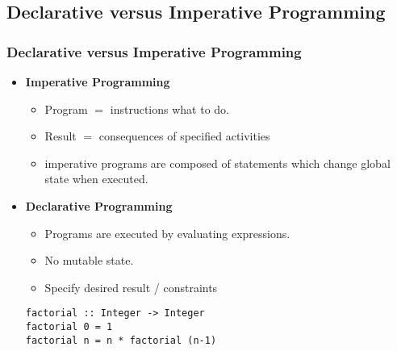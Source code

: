 \subsection{Declarative versus Imperative Programming}

\begin{frame}[fragile]
  \frametitle{Declarative versus Imperative Programming}
  \begin{itemize}
    \item {\bf Imperative Programming}
	  \begin{itemize}
	    \item Program $=$ instructions what to do.
	    \item Result $=$ consequences of specified activities
	    \item imperative programs are composed of statements which change global state when executed. 
	  \end{itemize}
    \item {\bf Declarative Programming}
	  \begin{itemize}
	    \item Programs are executed by evaluating expressions.
	    \item No mutable state. 
	    \item Specify desired result / constraints
	  \end{itemize}
\begin{lstlisting}
factorial :: Integer -> Integer
factorial 0 = 1
factorial n = n * factorial (n-1)
\end{lstlisting}  
	\end{itemize}	  

\end{frame}
